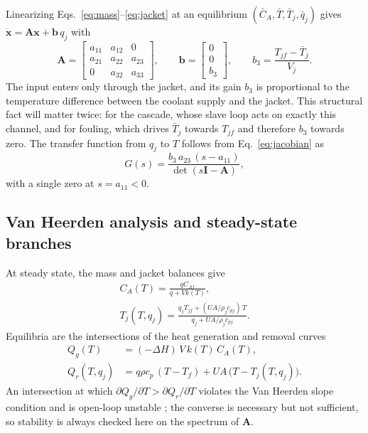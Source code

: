 Linearizing Eqs.~\eqref{eq:mass}--\eqref{eq:jacket} at an equilibrium $(\bar C_A,\bar T,\bar T_j,\bar q_j)$ gives $\dot{\mathbf{x}}=\mathbf{A}\mathbf{x}+\mathbf{b}\,q_j$ with
\begin{equation}
\mathbf{A}=\begin{bmatrix} a_{11} & a_{12} & 0\\ a_{21} & a_{22} & a_{23}\\ 0 & a_{32} & a_{33}\end{bmatrix},\qquad
\mathbf{b}=\begin{bmatrix}0\\0\\ b_3\end{bmatrix},\qquad b_3=\frac{T_{jf}-\bar T_j}{V_j}.
\label{eq:jacobian}
\end{equation}
The input enters only through the jacket, and its gain $b_3$ is proportional to the temperature difference between the coolant supply and the jacket. This structural fact will matter twice: for the cascade, whose slave loop acts on exactly this channel, and for fouling, which drives $\bar T_j$ towards $T_{jf}$ and therefore $b_3$ towards zero. The transfer function from $q_j$ to $T$ follows from Eq.~\eqref{eq:jacobian} as
\begin{equation}
G(s)=\frac{b_3\,a_{23}\,(s-a_{11})}{\det(s\mathbf{I}-\mathbf{A})},
\label{eq:gs}
\end{equation}
with a single zero at $s=a_{11}<0$.

\subsection{Van Heerden analysis and steady-state branches}
At steady state, the mass and jacket balances give
\begin{gather}
C_A(T)=\frac{qC_{Af}}{q+Vk(T)},\\
T_j(T,q_j)=\frac{q_jT_{jf}+(UA/\rho_jc_{pj})\,T}{q_j+UA/\rho_jc_{pj}}.
\end{gather}
Equilibria are the intersections of the heat generation and removal curves \cite{aris1958analysis,uppal1974dynamic,alvarez1995robust}
\begin{align}
Q_g(T) &= (-\Delta H)\,V\,k(T)\,C_A(T), \label{eq:qg}\\
Q_r(T,q_j) &= q\rho c_p\,(T-T_f) + UA\,\bigl(T-T_j(T,q_j)\bigr). \label{eq:qr}
\end{align}
An intersection at which $\partial Q_g/\partial T>\partial Q_r/\partial T$ violates the Van Heerden slope condition and is open-loop unstable \cite{seborg2010process,bequette2003process,luyben2007chemical}; the converse is necessary but not sufficient, so stability is always checked here on the spectrum of $\mathbf{A}$.


